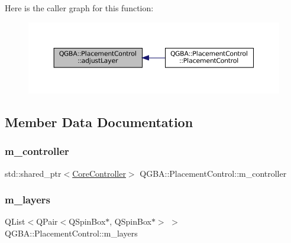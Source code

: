 Here is the caller graph for this function\+:
\nopagebreak
\begin{figure}[H]
\begin{center}
\leavevmode
\includegraphics[width=350pt]{class_q_g_b_a_1_1_placement_control_a3ad4059487a2fa2c77a7c9705379f671_icgraph}
\end{center}
\end{figure}


\subsection{Member Data Documentation}
\mbox{\label{class_q_g_b_a_1_1_placement_control_a40e21b5a9cf3fdb1798c977dd79e6249}} 
\subsubsection{\texorpdfstring{m\+\_\+controller}{m\_controller}}
{\footnotesize\ttfamily std\+::shared\+\_\+ptr$<$\mbox{\hyperlink{class_q_g_b_a_1_1_core_controller}{Core\+Controller}}$>$ Q\+G\+B\+A\+::\+Placement\+Control\+::m\+\_\+controller\hspace{0.3cm}{\ttfamily [private]}}

\mbox{\label{class_q_g_b_a_1_1_placement_control_af046d4e3465f7f8d0b19578e3b60f9dd}} 
\subsubsection{\texorpdfstring{m\+\_\+layers}{m\_layers}}
{\footnotesize\ttfamily Q\+List$<$Q\+Pair$<$Q\+Spin\+Box$\ast$, Q\+Spin\+Box$\ast$$>$ $>$ Q\+G\+B\+A\+::\+Placement\+Control\+::m\+\_\+layers\hspace{0.3cm}{\ttfamily [private]}}

